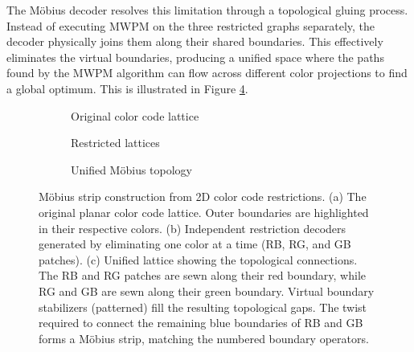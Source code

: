  The Möbius decoder resolves this limitation through a topological gluing process. Instead of executing MWPM on the three restricted graphs separately, the decoder physically joins them along their shared boundaries. This effectively eliminates the virtual boundaries, producing a unified space where the paths found by the MWPM algorithm can flow across different color projections to find a global optimum. This is illustrated in Figure \ref{fig:mobius_unified_lattice}.

\begin{figure}[htbp]
    \centering
    \begin{subfigure}[b]{0.27\textwidth}
        \centering
        \resizebox{\linewidth}{!}{}
        \caption{Original color code lattice}
        \label{fig:mobius_a}
    \end{subfigure}
    \hfill
    \begin{subfigure}[b]{0.27\textwidth}
        \centering
        \resizebox{\linewidth}{!}{}
        \caption{Restricted lattices}
        \label{fig:mobius_b}
    \end{subfigure}
    \hfill
    \begin{subfigure}[b]{0.4\textwidth}
        \centering
        \resizebox{\linewidth}{!}{}
        \caption{Unified M\"obius topology}
        \label{fig:mobius_c}
    \end{subfigure}
    \caption[M\"obius strip construction from 2D color code restrictions]{
        M\"obius strip construction from 2D color code restrictions. 
        (a) The original planar color code lattice. Outer boundaries are highlighted in their respective colors.
        (b) Independent restriction decoders generated by eliminating one color at a time (RB, RG, and GB patches).
        (c) Unified lattice showing the topological connections. The RB and RG patches are sewn along their red boundary, while RG and GB are sewn along their green boundary. Virtual boundary stabilizers (patterned) fill the resulting topological gaps. The twist required to connect the remaining blue boundaries of RB and GB forms a M\"obius strip, matching the numbered boundary operators.
    }
    \label{fig:mobius_unified_lattice}
\end{figure}


